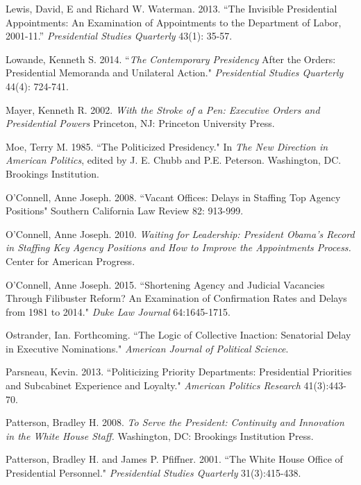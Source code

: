 \documentclass[12pt]{article}
\begin{document}
\noindent \hangindent=0.7cm Lewis, David, E and Richard W. Waterman. 2013. ``The Invisible Presidential Appointments: An Examination of Appointments to the Department of Labor, 2001-11.'' \textit{Presidential Studies Quarterly} 43(1): 35-57.

\noindent \hangindent=0.7cm Lowande, Kenneth S. 2014. ``\textit{The Contemporary Presidency} After the Orders: Presidential Memoranda and Unilateral Action." \textit{Presidential Studies Quarterly} 44(4): 724-741.

\noindent \hangindent=0.7cm Mayer, Kenneth R. 2002. \textit{With the Stroke of a Pen: Executive Orders and Presidential Powers} Princeton, NJ: Princeton University Press. 

\noindent \hangindent=0.7cm  Moe, Terry M. 1985. ``The Politicized Presidency." In \textit{The New Direction in American Politics}, edited by J. E. Chubb and P.E. Peterson. Washington, DC. Brookings Institution. 

\noindent \hangindent=0.7cm O'Connell, Anne Joseph. 2008. ``Vacant Offices: Delays in Staffing Top Agency Positions" Southern California Law Review 82: 913-999.

\noindent \hangindent=0.7cm O'Connell, Anne Joseph. 2010. \textit{Waiting for Leadership: President Obama's Record in Staffing Key Agency Positions and How to Improve the Appointments Process.} Center for American Progress. 

\noindent \hangindent=0.7cm O'Connell, Anne Joseph. 2015. ``Shortening Agency and Judicial Vacancies Through Filibuster Reform? An Examination of Confirmation Rates and Delays from 1981 to 2014." \textit{Duke Law Journal} 64:1645-1715.

\noindent \hangindent=0.7cm Ostrander, Ian. Forthcoming. ``The Logic of Collective Inaction: Senatorial Delay in Executive Nominations." \textit{American Journal of Political Science}.

\noindent \hangindent=0.7cm Parsneau, Kevin. 2013. ``Politicizing Priority Departments: Presidential Priorities and Subcabinet Experience and Loyalty." \textit{American Politics Research} 41(3):443-70.

\noindent \hangindent=0.7cm Patterson, Bradley H. 2008. \textit{To Serve the President: Continuity and Innovation in the White House Staff.} Washington, DC: Brookings Institution Press.

\noindent \hangindent=0.7cm Patterson, Bradley H. and James P. Pfiffner. 2001. ``The White House Office of Presidential Personnel." \textit{Presidential Studies Quarterly} 31(3):415-438.
\end{document}
